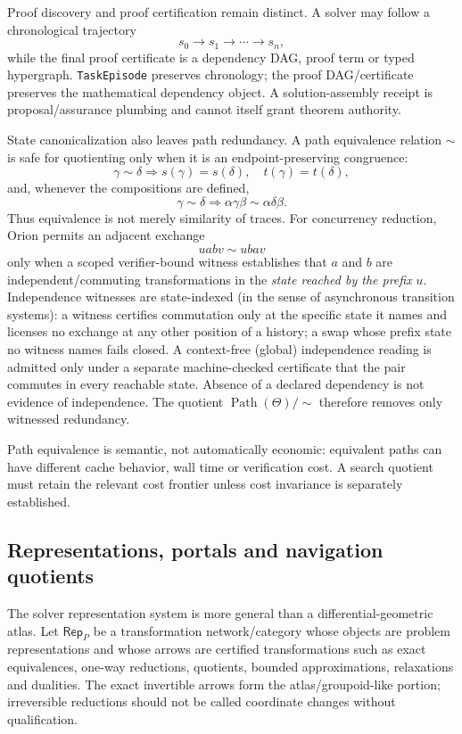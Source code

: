 Proof discovery and proof certification remain distinct. A solver may follow a chronological trajectory
\[
s_0\to s_1\to\cdots\to s_n,
\]
while the final proof certificate is a dependency DAG, proof term or typed hypergraph. \texttt{TaskEpisode} preserves chronology; the proof DAG/certificate preserves the mathematical dependency object. A solution-assembly receipt is proposal/assurance plumbing and cannot itself grant theorem authority.

State canonicalization also leaves path redundancy. A path equivalence relation $\sim$ is safe for quotienting only when it is an endpoint-preserving congruence:
\[
\gamma\sim\delta\Longrightarrow s(\gamma)=s(\delta),\quad t(\gamma)=t(\delta),
\]
and, whenever the compositions are defined,
\[
\gamma\sim\delta\Longrightarrow \alpha\gamma\beta\sim\alpha\delta\beta.
\]
Thus equivalence is not merely similarity of traces. For concurrency reduction, Orion permits an adjacent exchange
\[
uabv\sim ubav
\]
only when a scoped verifier-bound witness establishes that $a$ and $b$ are independent/commuting transformations in the \emph{state reached by the prefix} $u$. Independence witnesses are state-indexed (in the sense of asynchronous transition systems): a witness certifies commutation only at the specific state it names and licenses no exchange at any other position of a history; a swap whose prefix state no witness names fails closed. A context-free (global) independence reading is admitted only under a separate machine-checked certificate that the pair commutes in every reachable state. Absence of a declared dependency is not evidence of independence. The quotient $\operatorname{Path}(\Theta)/{\sim}$ therefore removes only witnessed redundancy.

Path equivalence is semantic, not automatically economic: equivalent paths can have different cache behavior, wall time or verification cost. A search quotient must retain the relevant cost frontier unless cost invariance is separately established.

\subsection{Representations, portals and navigation quotients}
The solver representation system is more general than a differential-geometric atlas. Let $\mathsf{Rep}_P$ be a transformation network/category whose objects are problem representations and whose arrows are certified transformations such as exact equivalences, one-way reductions, quotients, bounded approximations, relaxations and dualities. The exact invertible arrows form the atlas/groupoid-like portion; irreversible reductions should not be called coordinate changes without qualification.

